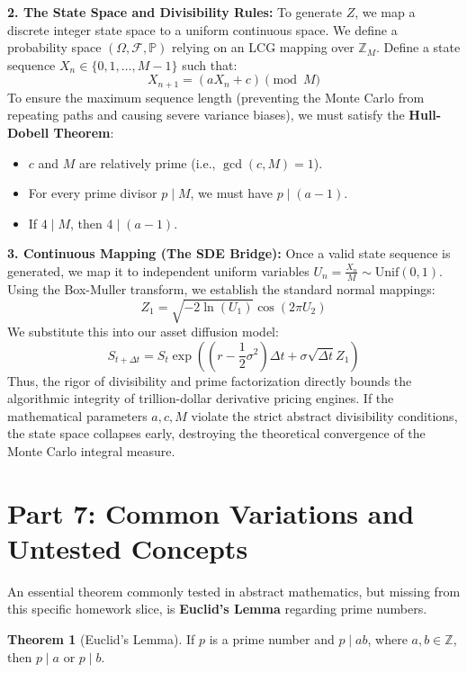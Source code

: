 \documentclass[11pt]{article}
\theoremstyle{definition}
\newtheorem{theorem}{Theorem}[section]
\theoremstyle{remark}
\begin{document}
\textbf{2. The State Space and Divisibility Rules:}
To generate $Z$, we map a discrete integer state space to a uniform continuous space. We define a probability space $(\Omega, \mathcal{F}, \mathbb{P})$ relying on an LCG mapping over $\mathbb{Z}_M$.
Define a state sequence $X_n \in \{0, 1, \dots, M-1\}$ such that:
\[ X_{n+1} = (aX_n + c) \pmod M \]
To ensure the maximum sequence length (preventing the Monte Carlo from repeating paths and causing severe variance biases), we must satisfy the \textbf{Hull-Dobell Theorem}:
\begin{itemize}
    \item $c$ and $M$ are relatively prime (i.e., $\gcd(c, M) = 1$).
    \item For every prime divisor $p \mid M$, we must have $p \mid (a - 1)$.
    \item If $4 \mid M$, then $4 \mid (a - 1)$.
\end{itemize}

\textbf{3. Continuous Mapping (The SDE Bridge):}
Once a valid state sequence is generated, we map it to independent uniform variables $U_n = \frac{X_n}{M} \sim \text{Unif}(0,1)$.
Using the Box-Muller transform, we establish the standard normal mappings:
\[ Z_1 = \sqrt{-2\ln(U_1)} \cos(2\pi U_2) \]
We substitute this into our asset diffusion model:
\[ S_{t+\Delta t} = S_t \exp\left( \left(r - \frac{1}{2}\sigma^2\right)\Delta t + \sigma \sqrt{\Delta t} Z_1 \right) \]
Thus, the rigor of divisibility and prime factorization directly bounds the algorithmic integrity of trillion-dollar derivative pricing engines. If the mathematical parameters $a, c, M$ violate the strict abstract divisibility conditions, the state space collapses early, destroying the theoretical convergence of the Monte Carlo integral measure.

\newpage
\section{Part 7: Common Variations and Untested Concepts}

An essential theorem commonly tested in abstract mathematics, but missing from this specific homework slice, is \textbf{Euclid's Lemma} regarding prime numbers.

\begin{theorem}[Euclid's Lemma]
If $p$ is a prime number and $p \mid ab$, where $a, b \in \mathbb{Z}$, then $p \mid a$ or $p \mid b$.
\end{theorem}
\end{document}
